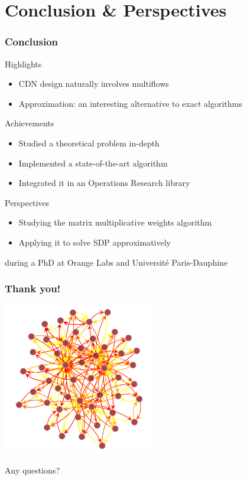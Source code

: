\documentclass{beamer}
\begin{document}
\section{Conclusion \& Perspectives}
\begin{frame}
    \frametitle{Conclusion}

    \begin{block}{Highlights}
        \begin{itemize}
            \item CDN design naturally involves multiflows
            \item Approximation: an interesting alternative to exact algorithms
        \end{itemize}
    \end{block}

    \begin{block}{Achievements}
        \begin{itemize}
            \item Studied a theoretical problem in-depth
            \item Implemented a state-of-the-art algorithm
            \item Integrated it in an Operations Research library
        \end{itemize}
    \end{block}

    \begin{block}{Perspectives}
        \begin{itemize}
            \item Studying the matrix multiplicative weights algorithm
            \item Applying it to solve SDP approximatively
        \end{itemize}
        during a PhD at Orange Labs and Universit\'e Paris-Dauphine
    \end{block}
\end{frame}

\begin{frame}
    \frametitle{Thank you!}

    \begin{center}
        \includegraphics[width=0.5\textwidth]{approx_multiflow.png}

        Any questions?
    \end{center}
\end{frame}
\end{document}
